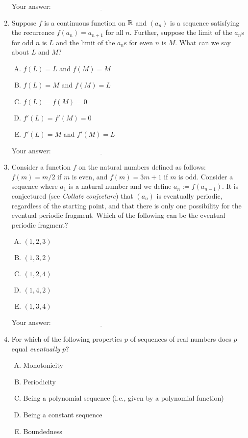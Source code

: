 \documentclass[10pt]{amsart}
\begin{document}
\begin{enumerate}
  \vspace{0.1in}
  Your answer: $\underline{\qquad\qquad\qquad\qquad\qquad\qquad\qquad}$
  \vspace{0.15in}

\item Suppose $f$ is a continuous function on $\mathbb{R}$ and $(a_n)$ is a
  sequence satisfying the recurrence $f(a_n) = a_{n+1}$ for all
  $n$. Further, suppose the limit of the $a_n$s for odd $n$ is $L$ and
  the limit of the $a_n$s for even $n$ is $M$. What can we say about
  $L$ and $M$?
  \begin{enumerate}[(A)]
  \item $f(L) = L$ and $f(M) = M$
  \item $f(L) = M$ and $f(M) = L$
  \item $f(L) = f(M) = 0$
  \item $f'(L) = f'(M) = 0$
  \item $f'(L) = M$ and $f'(M) = L$
  \end{enumerate}

  \vspace{0.1in}
  Your answer: $\underline{\qquad\qquad\qquad\qquad\qquad\qquad\qquad}$
  \vspace{0.15in}

\item Consider a function $f$ on the natural numbers defined as
  follows: $f(m) = m/2$ if $m$ is even, and $f(m) = 3m + 1$ if $m$ is
  odd. Consider a sequence where $a_1$ is a natural number and we
  define $a_n := f(a_{n-1})$. It is conjectured (see {\em Collatz
  conjecture}) that $(a_n)$ is eventually periodic, regardless of the
  starting point, and that there is only one possibility for the
  eventual periodic fragment. Which of the following can be the
  eventual periodic fragment?

  \begin{enumerate}[(A)]
  \item $(1,2,3)$
  \item $(1,3,2)$
  \item $(1,2,4)$
  \item $(1,4,2)$
  \item $(1,3,4)$
  \end{enumerate}

  \vspace{0.1in}
  Your answer: $\underline{\qquad\qquad\qquad\qquad\qquad\qquad\qquad}$
  \vspace{0.15in}

\item For which of the following properties $p$ of sequences of real
  numbers does $p$ equal {\em eventually} $p$?
  \begin{enumerate}[(A)]
  \item Monotonicity
  \item Periodicity
  \item Being a polynomial sequence (i.e., given by a polynomial function)
  \item Being a constant sequence
  \item Boundedness
  \end{enumerate}


\end{enumerate}
\end{document}
